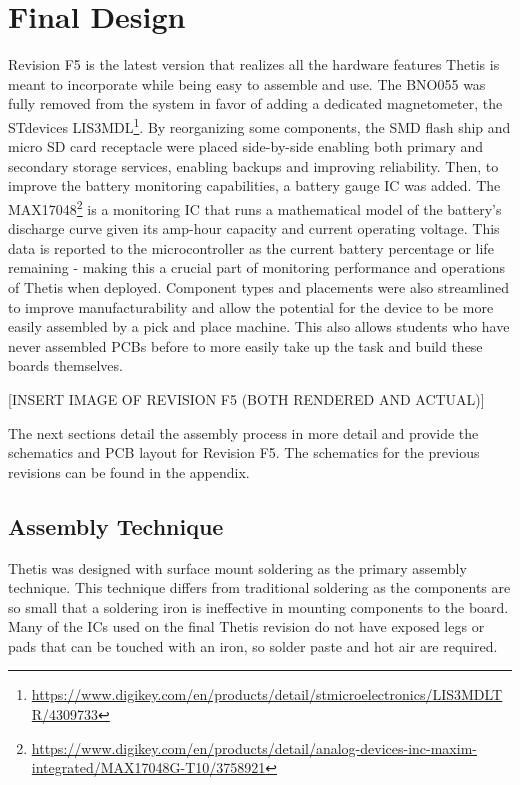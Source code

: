 \section{Final Design} \label{sec:final_design}
Revision F5 is the latest version that realizes all the hardware features Thetis is meant to incorporate while being easy to assemble and use.
The BNO055 was fully removed from the system in favor of adding a dedicated magnetometer, the STdevices LIS3MDL\footnote[4]{\url{https://www.digikey.com/en/products/detail/stmicroelectronics/LIS3MDLTR/4309733}}.
By reorganizing some components, the SMD flash ship and micro SD card receptacle were placed side-by-side enabling both primary and secondary storage services, enabling backups and improving reliability.
Then, to improve the battery monitoring capabilities, a battery gauge IC was added.
The MAX17048\footnote[5]{\url{https://www.digikey.com/en/products/detail/analog-devices-inc-maxim-integrated/MAX17048G-T10/3758921}} is a monitoring IC that runs a mathematical model of the battery's discharge curve given its amp-hour capacity and current operating voltage.
This data is reported to the microcontroller as the current battery percentage or life remaining - making this a crucial part of monitoring performance and operations of Thetis when deployed.
Component types and placements were also streamlined to improve manufacturability and allow the potential for the device to be more easily assembled by a pick and place machine.
This also allows students who have never assembled PCBs before to more easily take up the task and build these boards themselves.

[INSERT IMAGE OF REVISION F5 (BOTH RENDERED AND ACTUAL)]

The next sections detail the assembly process in more detail and provide the schematics and PCB layout for Revision F5.
The schematics for the previous revisions can be found in the appendix.



\subsection{Assembly Technique} \label{ssec:assembly_techniques}
Thetis was designed with surface mount soldering as the primary assembly technique.
This technique differs from traditional soldering as the components are so small that a soldering iron is ineffective in mounting components to the board.
Many of the ICs used on the final Thetis revision do not have exposed legs or pads that can be touched with an iron, so solder paste and hot air are required.

